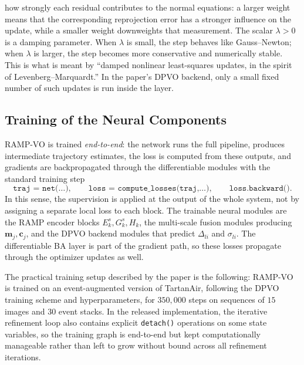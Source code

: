 \documentclass[11pt]{article}
\begin{document}
how strongly each residual contributes to the normal equations: a larger weight means that the corresponding 
reprojection error has a stronger influence on the update, while a smaller weight downweights that measurement. The scalar \(\lambda>0\) is a damping parameter. When \(\lambda\) is small, the step behaves 
like Gauss--Newton; when \(\lambda\) is larger, the step becomes more conservative and numerically stable. This is what is meant by ``damped nonlinear least-squares updates, in the spirit of Levenberg--Marquardt.''
 In the paper's DPVO backend, only a small fixed number of such updates is run inside the layer.

\subsection{Training of the Neural Components}

RAMP-VO is trained \emph{end-to-end}: the network runs the full pipeline, produces intermediate trajectory estimates, the loss is computed from these outputs, and gradients are backpropagated through the differentiable modules with the standard training step
\begin{equation}
\texttt{traj = net(\ldots)}, \qquad \texttt{loss = compute\_losses(traj,\ldots)}, \qquad \texttt{loss.backward()}.
\end{equation}
In this sense, the supervision is applied at the output of the whole system, not by assigning a separate local loss to each block. The trainable neural modules are the RAMP encoder blocks \(E_k^s,G_k^s,H_k\), the multi-scale fusion modules producing \(\mathbf{m}_j,\mathbf{c}_j\), and the DPVO backend modules that predict \(\Delta_{li}\) and \(\sigma_{li}\). The differentiable BA layer is part of the gradient path, so these losses propagate through the optimizer updates as well.

The practical training setup described by the paper is the following: RAMP-VO is trained on an event-augmented version of TartanAir, following the DPVO training scheme and hyperparameters, for \(350{,}000\) steps on sequences of \(15\) images and \(30\) event stacks. In the released implementation, the iterative refinement loop also contains explicit \texttt{detach()} operations on some state variables, so the training graph is end-to-end but kept computationally manageable rather than left to grow without bound across all refinement iterations.
\end{document}
